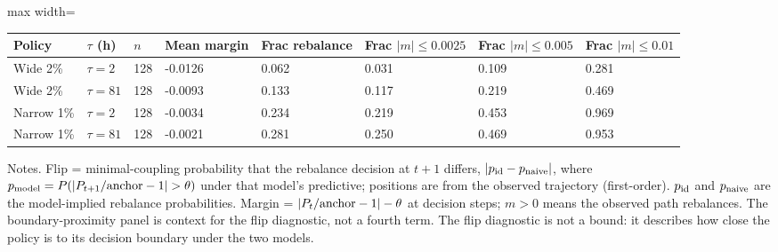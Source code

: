 \begin{table}[!htbp]
\begin{adjustbox}{max width=\linewidth}
\begin{tabular}{@{}llllllll@{}}
\toprule
Policy & $\tau$ (h) & $n$ & Mean margin & Frac rebalance & Frac $\vert m\vert\le0.0025$ & Frac $\vert m\vert\le0.005$ & Frac $\vert m\vert\le0.01$ \\
\midrule
Wide 2\% & $\tau=2$ & 128 & -0.0126 & 0.062 & 0.031 & 0.109 & 0.281 \\
Wide 2\% & $\tau=81$ & 128 & -0.0093 & 0.133 & 0.117 & 0.219 & 0.469 \\
Narrow 1\% & $\tau=2$ & 128 & -0.0034 & 0.234 & 0.219 & 0.453 & 0.969 \\
Narrow 1\% & $\tau=81$ & 128 & -0.0021 & 0.281 & 0.250 & 0.469 & 0.953 \\
\bottomrule
\end{tabular}
\end{adjustbox}
\vspace{0.5em}
\par\noindent\begin{minipage}{\linewidth}\raggedright{\scriptsize Notes. Flip = minimal-coupling probability that the rebalance decision at $t+1$ differs, $|p_{\rm id}-p_{\rm naive}|$, where $p_{\rm model} = P(|P_{t+1}/{\rm anchor}-1| > \theta)$ under that model's predictive; positions are from the observed trajectory (first-order). $p_{\rm id}$ and $p_{\rm naive}$ are the model-implied rebalance probabilities. Margin = $|P_t/{\rm anchor}-1| - \theta$ at decision steps; $m>0$ means the observed path rebalances. The boundary-proximity panel is context for the flip diagnostic, not a fourth term. The flip diagnostic is not a bound: it describes how close the policy is to its decision boundary under the two models.}\end{minipage}\par

\end{table}
